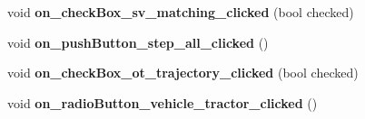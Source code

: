 \begin{DoxyCompactItemize}
\item 
\hypertarget{class_main_window_a0af13b96a48f857bf73d1a96127bef2e}{}void {\bfseries on\+\_\+check\+Box\+\_\+sv\+\_\+matching\+\_\+clicked} (bool checked)\label{class_main_window_a0af13b96a48f857bf73d1a96127bef2e}

\item 
\hypertarget{class_main_window_a2745acb01ad7238870e780136d2d4ad0}{}void {\bfseries on\+\_\+push\+Button\+\_\+step\+\_\+all\+\_\+clicked} ()\label{class_main_window_a2745acb01ad7238870e780136d2d4ad0}

\item 
\hypertarget{class_main_window_a4688d303088fdd99b120bda3f47819ad}{}void {\bfseries on\+\_\+check\+Box\+\_\+ot\+\_\+trajectory\+\_\+clicked} (bool checked)\label{class_main_window_a4688d303088fdd99b120bda3f47819ad}

\item 
\hypertarget{class_main_window_a2c994fd4801bf6c7cbb6f6478efb02ad}{}void {\bfseries on\+\_\+radio\+Button\+\_\+vehicle\+\_\+tractor\+\_\+clicked} ()\label{class_main_window_a2c994fd4801bf6c7cbb6f6478efb02ad}

\end{DoxyCompactItemize}
